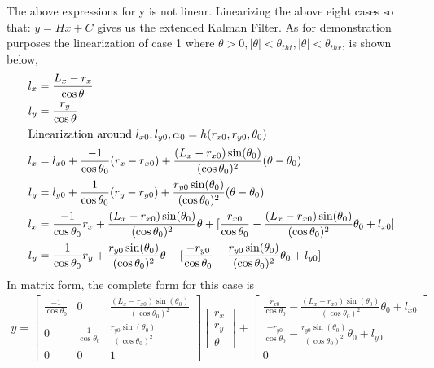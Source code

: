 \documentclass[12pt, letterpaper]{amsart} %
\numberwithin{equation}{section}
\begin{document}
\newpage
The above expressions for y is not linear. Linearizing the above eight cases so that: $y = Hx + C$ gives us the extended Kalman Filter. As for demonstration purposes the linearization of case 1 where $\theta >0, |\theta| < \theta_{tht}, |\theta| < \theta_{thr}$, is shown below,
\begin{align*}
  l_x &= \frac{L_x - r_x}{\cos \theta} \\
  l_y &= \frac{r_y}{\cos \theta} \\
  \intertext{Linearization around $l_{x0}, l_{y0}, \alpha_{0} = h(r_{x0}, r_{y0}, \theta_0)$}
  l_x &= l_{x0} + \frac{-1}{\cos \theta_0} (r_x - r_{x0}) + \frac{(L_x - r_{x0})\sin(\theta_0)}{(\cos{\theta_0})^2} (\theta - \theta_0) \\
  l_y &= l_{y0} + \frac{1}{\cos \theta_0}(r_y - r_{y0}) + \frac{r_{y0} \sin(\theta_0)}{(\cos \theta_0)^2} (\theta - \theta_0) \\
  l_x &= \frac{-1}{\cos \theta_0} r_x + \frac{(L_x - r_{x0})\sin(\theta_0)}{(\cos{\theta_0})^2} \theta + [\frac{r_{x0}}{\cos \theta_0} - \frac{(L_x - r_{x0})\sin(\theta_0)}{(\cos{\theta_0})^2}\theta_0 + l_{x0}] \\
  l_y &= \frac{1}{\cos \theta_0}r_y + \frac{r_{y0} \sin(\theta_0)}{(\cos \theta_0)^2} \theta + [\frac{-r_{y0}}{\cos \theta_0} - \frac{r_{y0} \sin(\theta_0)}{(\cos \theta_0)^2} \theta_0 + l_{y0}]
\end{align*}
In matrix form, the complete form for this case is
\begin{align*}
  y =
  \begin{bmatrix}
    \frac{-1}{\cos \theta_0} & 0 & \frac{(L_x - r_{x0})\sin(\theta_0)}{(\cos{\theta_0})^2} \\
    0 & \frac{1}{\cos \theta_0} & \frac{r_{y0} \sin(\theta_0)}{(\cos \theta_0)^2} \\
    0 & 0 & 1
  \end{bmatrix}
            \begin{bmatrix}
              r_x \\
              r_y \\
              \theta
            \end{bmatrix}
            +
            \begin{bmatrix}
              \frac{r_{x0}}{\cos \theta_0} - \frac{(L_x - r_{x0})\sin(\theta_0)}{(\cos{\theta_0})^2}\theta_0 + l_{x0} \\
              \frac{-r_{y0}}{\cos \theta_0} - \frac{r_{y0} \sin(\theta_0)}{(\cos \theta_0)^2} \theta_0 + l_{y0} \\
              0
            \end{bmatrix}
\end{align*}
\end{document}
